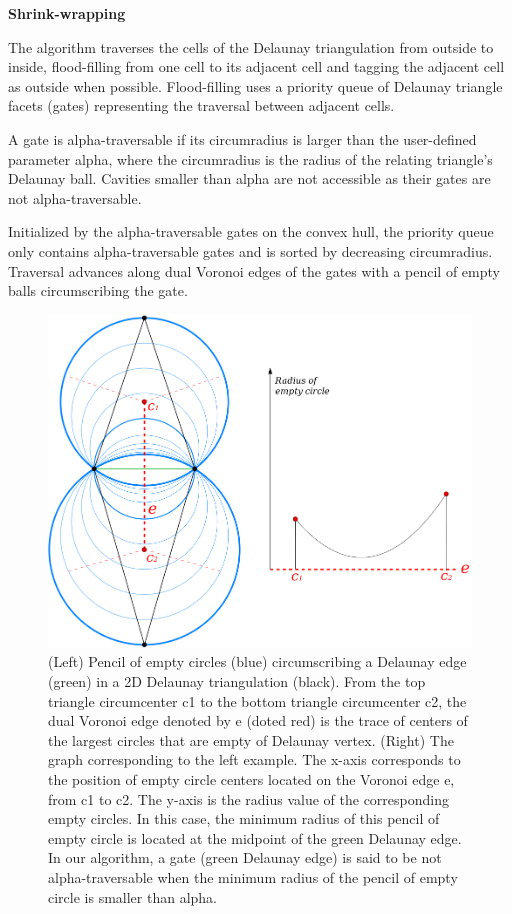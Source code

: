\documentclass[12pt]{article}
\begin{document}
\textbf{Shrink-wrapping}

The algorithm traverses the cells of the Delaunay triangulation from outside to inside,
flood-filling from one cell to its adjacent cell and tagging the adjacent cell as
outside when possible. Flood-filling uses a priority queue of Delaunay triangle facets
(gates) representing the traversal between adjacent cells.

A gate is alpha-traversable if its circumradius is larger than the user-defined
parameter alpha, where the circumradius is the radius of the relating triangle's
Delaunay ball. Cavities smaller than alpha are not accessible as their gates are not
alpha-traversable.

Initialized by the alpha-traversable gates on the convex hull, the priority queue only
contains alpha-traversable gates and is sorted by decreasing circumradius. Traversal
advances along dual Voronoi edges of the gates with a pencil of empty balls
circumscribing the gate.

\begin{figure}[H]
    \centering
        \centering
        \includegraphics[width=\textwidth]{images/aw3_pencil.png}
        \caption{(Left) Pencil of empty circles (blue) circumscribing a Delaunay
        edge (green) in a 2D Delaunay triangulation (black). From the top triangle
        circumcenter c1 to the bottom triangle circumcenter c2, the dual Voronoi
         edge denoted by e (doted red) is the trace of centers of the largest circles
          that are empty of Delaunay vertex. (Right) The graph corresponding to the
          left example. The x-axis corresponds to the position of empty circle centers
           located on the Voronoi edge e, from c1 to c2. The y-axis is the radius
            value of the corresponding empty circles. In this case, the minimum
            radius of this pencil of empty circle is located at the midpoint of
            the green Delaunay edge. In our algorithm, a gate (green Delaunay edge)
             is said to be not alpha-traversable when the minimum radius of the pencil
              of empty circle is smaller than alpha. }
\end{figure}
\end{document}
